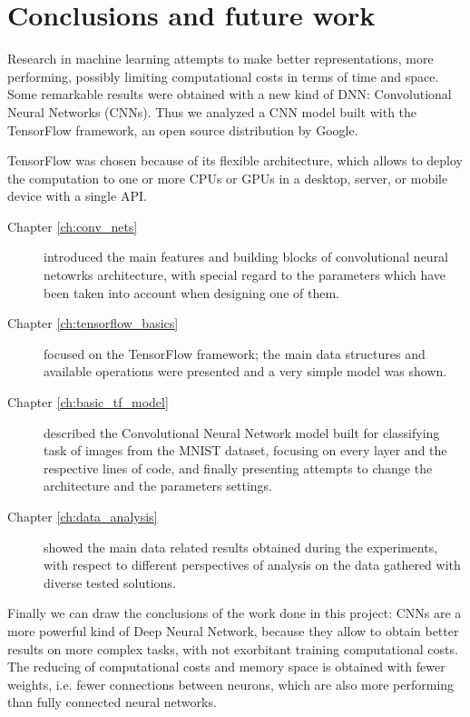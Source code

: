 \chapter{Conclusions and future work}\label{ch:conclusions}

Research in machine learning attempts to make better representations, more performing, possibly limiting computational costs in terms of time and space. Some remarkable results were obtained with a new kind of \acs{DNN}: Convolutional Neural Networks (\acsp{CNN}). Thus we analyzed a \acs{CNN} model built with the TensorFlow framework, an open source distribution by Google.

TensorFlow was chosen because of its flexible architecture, which allows to deploy the computation to one or more \acsp{CPU} or \acsp{GPU} in a desktop, server, or mobile device with a single \acs{API}.

\begin{description}
	\item[Chapter \ref{ch:conv_nets}] introduced the main features and building blocks of convolutional neural netowrks architecture, with special regard to the parameters which have been taken into account when designing one of them.
	
	\item[Chapter \ref{ch:tensorflow_basics}] focused on the TensorFlow framework; the main data structures and available operations were presented and a very simple model was shown.
	
	\item[Chapter \ref{ch:basic_tf_model}] described the Convolutional Neural Network model built for classifying task of images from the \acs{MNIST} dataset, focusing on every layer and the respective lines of code, and finally presenting attempts to change the architecture and the parameters settings.
	
	\item[Chapter \ref{ch:data_analysis}] showed the main data related results obtained during the experiments, with respect to different perspectives of analysis on the data gathered with diverse tested solutions.
\end{description}

Finally we can draw the conclusions of the work done in this project: \acsp{CNN} are a more powerful kind of Deep Neural Network, because they allow to obtain better results on more complex tasks, with not exorbitant training computational costs. The reducing of computational costs and memory space is obtained with fewer weights, i.e. fewer connections between neurons, which are also more performing than fully connected neural networks.


